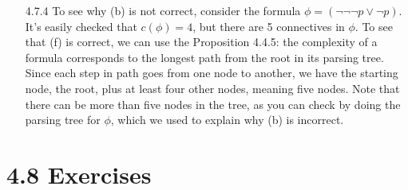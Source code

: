 \begin{enumerate}
		\item[4.7.4] To see why (b) is not correct, consider the formula $\phi=(\neg\neg\neg p\lor \neg p)$. It's easily checked that $c(\phi)=4$, but there are 5 connectives in $\phi$. To see that (f) is correct, we can use the Proposition 4.4.5: the complexity of a formula corresponds to the longest path from the root in its parsing tree. Since each step in path goes from one node to another, we have the starting node, the root, plus at least four other nodes, meaning five nodes. Note that there can be more than five nodes in the tree, as you can check by doing the parsing tree for $\phi$, which we used to explain why (b) is incorrect.
	
	\end{enumerate}

\section*{4.8 Exercises}

